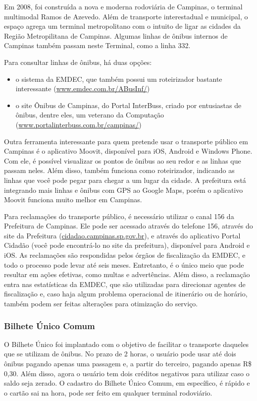 Em 2008, foi construída a nova e moderna rodoviária de Campinas, o terminal
multimodal Ramos de Azevedo. Além de transporte interestadual e municipal, o
espaço agrega um terminal metropolitano com o intuito de ligar as cidades da
Região Metropilitana de Campinas. Algumas linhas de ônibus internos de Campinas
também passam neste Terminal, como a linha 332.

Para consultar linhas de ônibus, há duas opções:
\begin{itemize}
\item o sistema da EMDEC, que também possui um roteirizador bastante
  interessante (\url{www.emdec.com.br/ABusInf/})
\item o site Ônibus de Campinas, do Portal InterBuss, criado por entusiastas
  de ônibus, dentre eles, um veterano da Computação
  (\url{www.portalinterbuss.com.br/campinas/})
\end{itemize}

Outra ferramenta interessante para quem pretende usar o transporte público em
Campinas é o aplicativo Moovit, disponível para iOS, Android e Windows
Phone. Com ele, é possível visualizar os pontos de ônibus ao seu redor e as
linhas que passam neles. Além disso, também funciona como roteirizador,
indicando as linhas que você pode pegar para chegar a um lugar da cidade. A
prefeitura está integrando mais linhas e ônibus com GPS ao Google Maps, porém
o aplicativo Moovit funciona muito melhor em Campinas.

Para reclamações do transporte público, é necessário utilizar o canal 156 da
Prefeitura de Campinas. Ele pode ser acessado através do telefone 156, através
do site da Prefeitura (\url{cidadao.campinas.sp.gov.br}), e através do
aplicativo Portal Cidadão (você pode encontrá-lo no site da prefeitura),
disponível para Android e iOS. As reclamações são respondidas pelos órgãos de
fiscalização da EMDEC, e todo o processo pode levar até seis meses. Entretanto,
é o único meio que pode resultar em ações efetivas, como multas e advertências.
Além disso, a reclamação entra nas estatísticas da EMDEC, que são utilizadas
para direcionar agentes de fiscalização e, caso haja algum problema operacional
de itinerário ou de horário, também podem ser feitas alterações para otimização
do serviço.

\subsubsection{Bilhete Único Comum}

O Bilhete Único foi implantado com o objetivo de facilitar o transporte
daqueles que se utilizam de ônibus. No prazo de 2 horas, o usuário pode usar
até dois ônibus pagando apenas uma passagem e, a partir do terceiro, pagando
apenas R\$ 0,30. Além disso, agora o usuário tem dois créditos negativos para
utilizar caso o saldo seja zerado. O cadastro do Bilhete Único Comum, em
específico, é rápido e o cartão sai na hora, pode ser feito em qualquer
terminal rodoviário.

